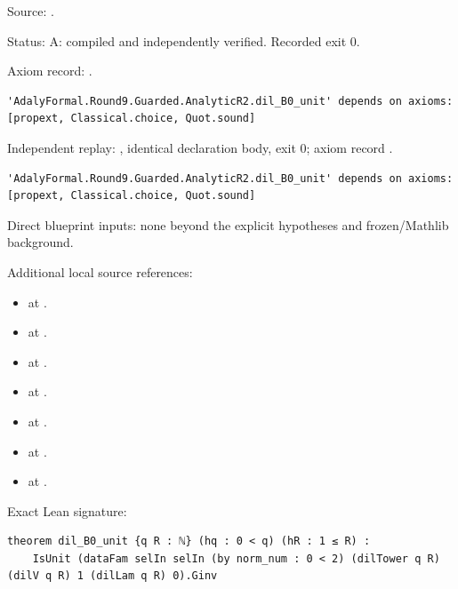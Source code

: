 \begin{theorem}[bp-092]
\par Source: \texttt{}.
\par Status: A: compiled and independently verified. Recorded exit 0.
\par Axiom record: \texttt{}.
\begin{verbatim}
'AdalyFormal.Round9.Guarded.AnalyticR2.dil_B0_unit' depends on axioms: [propext, Classical.choice, Quot.sound]
\end{verbatim}
\par Independent replay: \texttt{}, identical declaration body, exit 0; axiom record \texttt{}.
\begin{verbatim}
'AdalyFormal.Round9.Guarded.AnalyticR2.dil_B0_unit' depends on axioms: [propext, Classical.choice, Quot.sound]
\end{verbatim}
\par Direct blueprint inputs: none beyond the explicit hypotheses and frozen/Mathlib background.
\par Additional local source references:
\begin{itemize}
\item \texttt{} at \texttt{}.
\item \texttt{} at \texttt{}.
\item \texttt{} at \texttt{}.
\item \texttt{} at \texttt{}.
\item \texttt{} at \texttt{}.
\item \texttt{} at \texttt{}.
\item \texttt{} at \texttt{}.
\end{itemize}
\par Exact Lean signature:
\begin{verbatim}
theorem dil_B0_unit {q R : ℕ} (hq : 0 < q) (hR : 1 ≤ R) :
    IsUnit (dataFam selIn selIn (by norm_num : 0 < 2) (dilTower q R) (dilV q R) 1 (dilLam q R) 0).Ginv
\end{verbatim}
\end{theorem}

